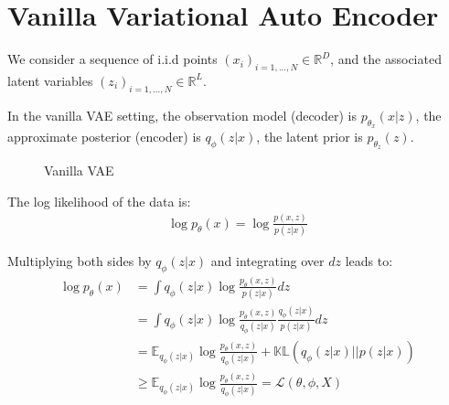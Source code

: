 
\chapter{Vanilla Variational Auto Encoder}\label{Vanilla VAE}
    
We consider a sequence of i.i.d points $(x_i)_{i=1,...,N} \in \mathbb{R}^D$, and the associated latent variables $(z_i)_{i=1,...,N} \in \mathbb{R}^L$. 

In the vanilla VAE setting, the observation model (decoder) is $p_{\theta_x}(x \vert z)$, the approximate posterior (encoder) is $q_{\phi}(z \vert x)$, the latent prior is $p_{\theta_z}(z)$.

\begin{figure}[H]
\begin{center}
\caption{Vanilla VAE}
\label{fig:vanilla_vae}
\end{center}
\end{figure}

The log likelihood of the data is:
\begin{align*}
    \log{p_{\theta}(x)} = \log{\frac{p(x,z)}{p(z\vert x)}}
\end{align*}

Multiplying both sides by $q_\phi(z \vert x)$ and integrating over $dz$ leads to:
\begin{align*}
    \log{p_{\theta}(x)} &= \int q_\phi(z \vert x) \log{\frac{p_\theta(x,z)}{p(z\vert x)}}dz \\
    &= \int q_\phi(z\vert x) \log{\frac{p_\theta(x,z)}{q_\phi(z\vert x)}\frac{q_\phi(z \vert x)}{p(z \vert x)}}dz \\
    &= \mathbb{E}_{q_\phi(z \vert x)} \log{\frac{p_\theta(x,z)}{q_\phi(z \vert x)}} + \mathbb{KL}(q_\phi(z \vert x) \vert\vert p(z \vert x)) \\
    &\geq \mathbb{E}_{q_\phi(z \vert x)} \log{\frac{p_\theta(x,z)}{q_\phi(z \vert x)}} = \mathcal{L}(\theta, \phi, X)
\end{align*}


